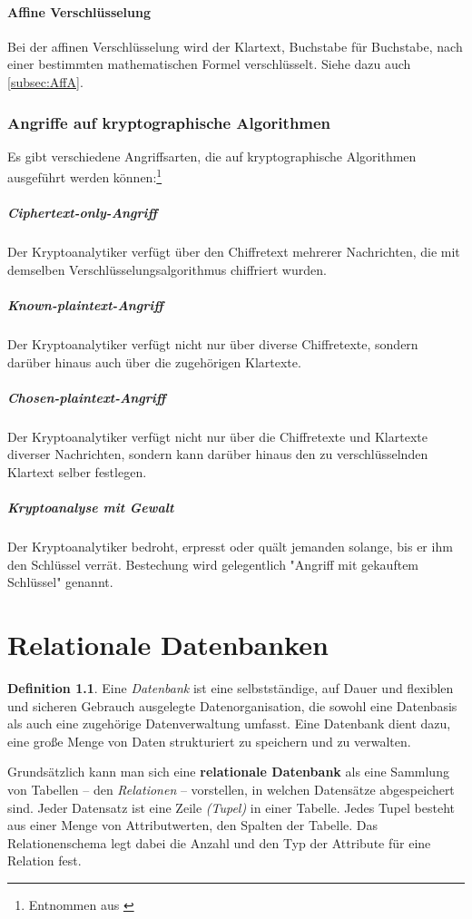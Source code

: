 \documentclass[a4paper,10pt,DIV9, BCOR12mm, oneside,openright,openbib]{scrreprt}
\theoremstyle{definition}
\newtheorem{mydef}{Definition}[section]
\theoremstyle{plain}
\begin{document}
\subsubsection{Affine Verschlüsselung}
Bei der affinen Verschlüsselung wird der Klartext, Buchstabe für Buchstabe, nach einer bestimmten mathematischen Formel verschlüsselt. Siehe dazu auch \ref{subsec:AffA}.

\subsection{Angriffe auf kryptographische Algorithmen}
Es gibt verschiedene Angriffsarten, die auf kryptographische Algorithmen ausgeführt werden können:\footnote{Entnommen aus \cite{Kluth2011}}
\paragraph{Ciphertext-only-Angriff}
Der Kryptoanalytiker verfügt über den Chiffretext mehrerer Nachrichten, die mit demselben Verschlüsselungsalgorithmus chiffriert wurden.
\paragraph{Known-plaintext-Angriff}
Der Kryptoanalytiker verfügt nicht nur über diverse Chiffretexte, sondern darüber hinaus auch über die zugehörigen Klartexte.
\paragraph{Chosen-plaintext-Angriff}
Der Kryptoanalytiker verfügt nicht nur über die Chiffretexte und Klartexte diverser Nachrichten, sondern kann darüber hinaus den zu verschlüsselnden Klartext selber festlegen.
\paragraph{Kryptoanalyse mit Gewalt}
Der Kryptoanalytiker bedroht, erpresst oder quält jemanden solange, bis er ihm den Schlüssel verrät. Bestechung wird gelegentlich "Angriff mit gekauftem Schlüssel" genannt.

\chapter{Relationale Datenbanken}
\begin{mydef} Eine \textit{Datenbank} ist eine selbstständige, auf Dauer und flexiblen und sicheren Gebrauch ausgelegte Datenorganisation, die sowohl eine Datenbasis als auch eine zugehörige Datenverwaltung umfasst. Eine Datenbank dient dazu, eine große Menge von Daten strukturiert zu speichern und zu verwalten.
\end{mydef}
Grundsätzlich kann man sich eine \textbf{relationale Datenbank} als eine Sammlung von Tabellen – den \textit{Relationen} – vorstellen, in welchen Datensätze abgespeichert sind. Jeder Datensatz ist eine Zeile \textit{(Tupel)} in einer Tabelle. Jedes Tupel besteht aus einer Menge von Attributwerten, den Spalten der Tabelle. Das Relationenschema legt dabei die Anzahl und den Typ der Attribute für eine Relation fest. 
\end{document}
